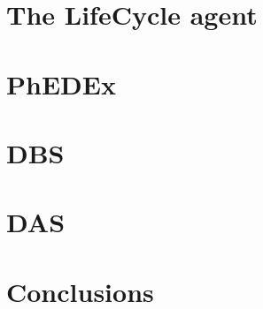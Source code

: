 \documentclass[a4paper]{jpconf}
\begin{document}
\section{The LifeCycle agent}


\section{PhEDEx}


\section{DBS}


\section{DAS}


\section{Conclusions}


\par

\end{document}
